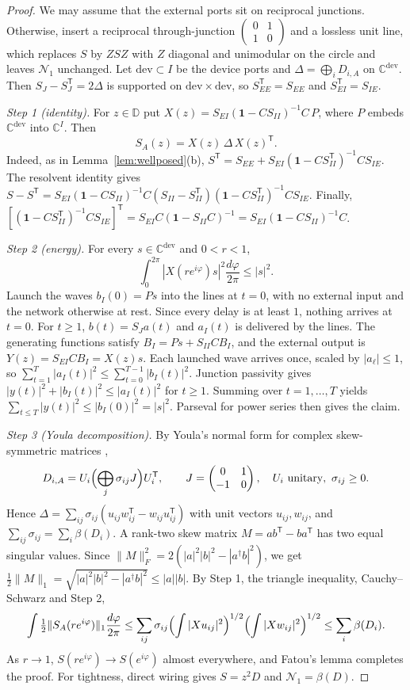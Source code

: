 \documentclass[11pt]{article}
\theoremstyle{definition}
\theoremstyle{remark}
\newcommand{\NN}{\mathcal N_1}
\newcommand{\D}{\mathbb D}
\newcommand{\one}{\mathbf 1}
\newcommand{\T}{\mathsf T}
\begin{document}
\begin{proof}
We may assume that the external ports sit on reciprocal junctions. Otherwise, insert a reciprocal through-junction $\left(\begin{smallmatrix}0&1\\1&0\end{smallmatrix}\right)$ and a lossless unit line, which replaces $S$ by $ZSZ$ with $Z$ diagonal and unimodular on the circle and leaves $\NN$ unchanged. Let $\mathrm{dev}\subset I$ be the device ports and $\Delta=\bigoplus_iD_{i,A}$ on $\mathbb C^{\mathrm{dev}}$. Then $S_J-S_J^\T=2\Delta$ is supported on $\mathrm{dev}\times\mathrm{dev}$, so $S_{EE}^\T=S_{EE}$ and $S_{EI}^\T=S_{IE}$.

\emph{Step 1 (identity).} For $z\in\D$ put $X(z)=S_{EI}(\one-CS_{II})^{-1}C\,P$, where $P$ embeds $\mathbb C^{\mathrm{dev}}$ into $\mathbb C^I$. Then
\[
S_A(z)=X(z)\,\Delta\,X(z)^\T .
\]
Indeed, as in Lemma~\ref{lem:wellposed}(b), $S^\T=S_{EE}+S_{EI}(\one-CS_{II}^\T)^{-1}CS_{IE}$. The resolvent identity gives $S-S^\T=S_{EI}(\one-CS_{II})^{-1}C(S_{II}-S_{II}^\T)(\one-CS_{II}^\T)^{-1}CS_{IE}$. Finally, $[(\one-CS_{II}^\T)^{-1}CS_{IE}]^\T=S_{EI}C(\one-S_{II}C)^{-1}=S_{EI}(\one-CS_{II})^{-1}C$.

\emph{Step 2 (energy).} For every $s\in\mathbb C^{\mathrm{dev}}$ and $0<r<1$,
\[
\int_0^{2\pi}|X(re^{i\varphi})s|^2\frac{d\varphi}{2\pi}\le|s|^2 .
\]
Launch the waves $b_I(0)=Ps$ into the lines at $t=0$, with no external input and the network otherwise at rest. Since every delay is at least $1$, nothing arrives at $t=0$. For $t\ge1$, $b(t)=S_Ja(t)$ and $a_I(t)$ is delivered by the lines. The generating functions satisfy $B_I=Ps+S_{II}CB_I$, and the external output is $Y(z)=S_{EI}CB_I=X(z)s$. Each launched wave arrives once, scaled by $|a_\ell|\le1$, so $\sum_{t=1}^T|a_I(t)|^2\le\sum_{t=0}^{T-1}|b_I(t)|^2$. Junction passivity gives $|y(t)|^2+|b_I(t)|^2\le|a_I(t)|^2$ for $t\ge1$. Summing over $t=1,\dots,T$ yields $\sum_{t\le T}|y(t)|^2\le|b_I(0)|^2=|s|^2$. Parseval for power series then gives the claim.

\emph{Step 3 (Youla decomposition).} By Youla's normal form for complex skew-symmetric matrices \cite{You61},
\[
D_{i,A}=U_i\Bigl(\bigoplus_j\sigma_{ij}J\Bigr)U_i^\T,\qquad J=\begin{pmatrix}0&1\\-1&0\end{pmatrix},\quad U_i\ \text{unitary},\ \sigma_{ij}\ge0 .
\] Hence $\Delta=\sum_{ij}\sigma_{ij}(u_{ij}w_{ij}^\T-w_{ij}u_{ij}^\T)$ with unit vectors $u_{ij},w_{ij}$, and $\sum_{ij}\sigma_{ij}=\sum_i\beta(D_i)$. A rank-two skew matrix $M=ab^\T-ba^\T$ has two equal singular values. Since $\|M\|_F^2=2(|a|^2|b|^2-|a^\dagger b|^2)$, we get $\frac12\|M\|_1=\sqrt{|a|^2|b|^2-|a^\dagger b|^2}\le|a||b|$. By Step 1, the triangle inequality, Cauchy--Schwarz and Step 2,
\[
\int\tfrac12\|S_A(re^{i\varphi})\|_1\frac{d\varphi}{2\pi}\le\sum_{ij}\sigma_{ij}\Bigl(\int|Xu_{ij}|^2\Bigr)^{1/2}\Bigl(\int|Xw_{ij}|^2\Bigr)^{1/2}\le\sum_i\beta(D_i).
\]
As $r\to1$, $S(re^{i\varphi})\to S(e^{i\varphi})$ almost everywhere, and Fatou's lemma completes the proof. For tightness, direct wiring gives $S=z^2D$ and $\NN=\beta(D)$.
\end{proof}
\end{document}
